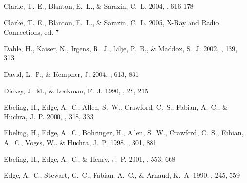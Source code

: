 \documentclass[12pt,preprint]{aastex}
\begin{document}
\begin{thebibliography}{}
{Clarke}, T.~E., {Blanton}, E.~L., \& {Sarazin}, C.~L. 2004, \apj,
  616 178

{Clarke}, T.~E., {Blanton}, E.~L., \& {Sarazin}, C.~L. 2005, X-Ray
  and Radio Connections, ed. 7

{Dahle}, H., {Kaiser}, N., {Irgens}, R.~J., {Lilje}, P.~B., \& {Maddox}, S.~J.
  2002, \apjs, 139, 313

{David}, L.~P., \& {Kempner}, J. 2004, \apj, 613, 831

{Dickey}, J.~M., \& {Lockman}, F.~J. 1990, \araa, 28, 215

{Ebeling}, H., {Edge}, A.~C., {Allen}, S.~W., {Crawford}, C.~S., {Fabian},
  A.~C., \& {Huchra}, J.~P. 2000, \mnras, 318, 333

{Ebeling}, H., {Edge}, A.~C., {Bohringer}, H., {Allen}, S.~W., {Crawford},
  C.~S., {Fabian}, A.~C., {Voges}, W., \& {Huchra}, J.~P. 1998, \mnras, 301,
  881

{Ebeling}, H., {Edge}, A.~C., \& {Henry}, J.~P. 2001, \apj, 553, 668

{Edge}, A.~C., {Stewart}, G.~C., {Fabian}, A.~C., \& {Arnaud}, K.~A. 1990,
  \mnras, 245, 559


\end{thebibliography}
\end{document}
